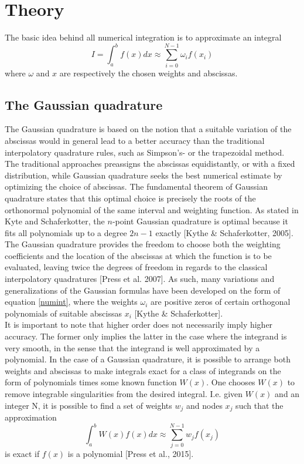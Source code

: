 \documentclass[%
reprint,
amsmath,amssymb,
aps,
]{revtex4-1}
\begin{document}
\section{Theory} \noindent 
The basic idea behind all numerical integration is to approximate an integral 
\begin{equation}\label{numint}
I = \int_{a}^{b}f(x)dx \approx \sum_{i=0}^{N-1} \omega_if(x_i)
\end{equation}
where $\omega$ and $x$ are respectively the chosen weights and abscissas. 


\subsection*{The Gaussian quadrature} \noindent 
The Gaussian quadrature is based on the notion that a suitable variation of the abscissas would in general lead to a better accuracy than the traditional interpolatory quadrature rules, such as Simpson's- or the trapezoidal method. The traditional approaches preassigns the abscissas equidistantly, or with a fixed distribution, while Gaussian quadrature seeks the best numerical estimate by optimizing the choice of abscissas. The fundamental theorem of Gaussian quadrature states that this optimal choice is precisely the roots of the orthonormal polynomial of the same interval and weighting function. As stated in Kyte and Schaferkotter, the $n$-point Gaussian quadrature is optimal because it fits all polynomials up to a degree $2n-1$ exactly [Kythe \& Schaferkotter, 2005]. \\ \indent 
The Gaussian quadrature provides the freedom to choose both the weighting coefficients and the location of the abscissas at which the function is to be evaluated, leaving twice the degrees of freedom in regards to the classical interpolatory quadratures [Press et al. 2007]. As such, many variations and generalizations of the Gaussian formulas have been developed on the form of equation \ref{numint}, where the weights $\omega_i$ are positive zeros of certain orthogonal polynomials of suitable abscissas $x_i$ [Kythe \& Schaferkotter]. \\
\indent It is important to note that higher order does not necessarily imply higher accuracy. The former only implies the latter in the case where the integrand is very smooth, in the sense that the integrand is well approximated by a polynomial. In the case of a Gaussian quadrature, it is possible to arrange both weights and abscissas to make integrals exact for a class of integrands on the form of polynomials times some known function $W(x)$. One chooses $W(x)$ to remove integrable singularities from the desired integral. I.e. given $W(x)$ and an integer N, it is possible to find a set of weights $w_j$ and nodes $x_j$ such that the approximation 
\begin{equation*}
	\int_{a}^{b}W(x)f(x)dx \approx \sum_{j = 0}^{N-1}w_jf(x_j)
\end{equation*}
is exact if $f(x)$ is a polynomial [Press et al., 2015].
\end{document}
